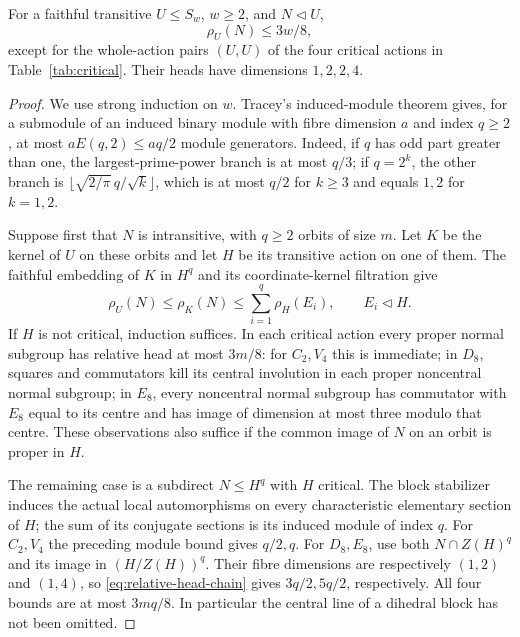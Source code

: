 \begin{theorem}\label{thm:first-head}
For a faithful transitive $U\leq S_w$, $w\geq2$, and $N\lhd U$,
\[
 \rho_U(N)\leq3w/8,
\]
except for the whole-action pairs $(U,U)$ of the four critical actions
in Table~\ref{tab:critical}. Their heads have dimensions $1,2,2,4$.
\end{theorem}
\begin{proof}
We use strong induction on $w$. Tracey's induced-module theorem
\cite[Theorem~1.6]{Tracey2018} gives, for a submodule of an induced
binary module with fibre dimension $a$ and index $q\geq2$, at most
$aE(q,2)\leq aq/2$ module generators. Indeed, if $q$ has odd part
greater than one, the largest-prime-power branch is at most $q/3$;
if $q=2^k$, the other branch is
$\lfloor\sqrt{2/\pi}\,q/\sqrt{k}\rfloor$, which is at most $q/2$
for $k\geq3$ and equals $1,2$ for $k=1,2$.

Suppose first that $N$ is intransitive, with $q\geq2$ orbits of size
$m$. Let $K$ be the kernel of $U$ on these orbits and let $H$ be its
transitive action on one of them. The faithful embedding of $K$ in
$H^q$ and its coordinate-kernel filtration give
\[
 \rho_U(N)\leq\rho_K(N)\leq\sum_{i=1}^q\rho_H(E_i),
 \qquad E_i\lhd H.
\]
If $H$ is not critical, induction suffices. In each critical action
every proper normal subgroup has relative head at most $3m/8$:
for $C_2,V_4$ this is immediate; in $D_8$, squares and commutators
kill its central involution in each proper noncentral normal subgroup;
in $E_8$, every noncentral normal subgroup has commutator with $E_8$
equal to its centre and has image of dimension at most three modulo
that centre. These observations also suffice if the common image of
$N$ on an orbit is proper in $H$.

The remaining case is a subdirect $N\leq H^q$ with $H$ critical.
The block stabilizer induces the actual local automorphisms on every
characteristic elementary section of $H$; the sum of its conjugate
sections is its induced module of index $q$. For $C_2,V_4$ the preceding
module bound gives $q/2,q$. For $D_8,E_8$, use both
$N\cap Z(H)^q$ and its image in $(H/Z(H))^q$. Their fibre dimensions
are respectively $(1,2)$ and $(1,4)$, so
\eqref{eq:relative-head-chain} gives $3q/2,5q/2$, respectively.
All four bounds are at most $3mq/8$. In particular the central line
of a dihedral block has not been omitted.


\end{proof}
